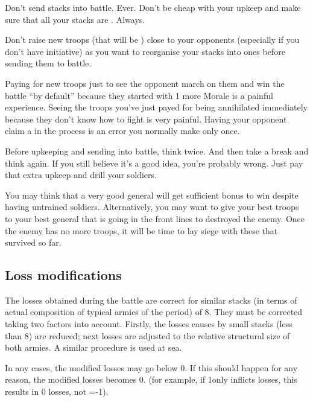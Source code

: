 \begin{playtip}
  Don't send  stacks into battle. Ever. Don't be cheap with
  your upkeep and make sure that all your stacks are . Always.

  Don't raise new troops (that will be ) close to your
  opponents (especially if you don't have initiative) as you want to
  reorganise your stacks into  ones before sending them to
  battle.

  Paying for new troops just to see the opponent march on them and win the
  battle ``by default'' because they started with 1 more Morale is a painful
  experience. Seeing the troops you've just payed for being annihilated
  immediately because they don't know how to fight is very painful. Having
  your opponent claim a  in the process is an error you
  normally make only once.

  Before upkeeping and sending  into battle, think twice. And
  then take a break and think again. If you still believe it's a good idea,
  you're probably wrong. Just pay that extra upkeep and drill your soldiers.

  You may think that a very good general will get sufficient bonus to win
  despite having untrained soldiers. Alternatively, you may want to give your
  best troops to your best general that is going in the front lines to
  destroyed the enemy. Once the enemy has no more troops, it will be time to
  lay siege with these  that survived so far.
\end{playtip}

\subsection{Loss modifications}
\label{chMilitary:Battle:Loss modifications}
The losses obtained during the battle are correct for similar stacks (in terms
of actual composition of typical armies of the period) of 8\LD. They must be
corrected taking two factors into account. Firstly, the losses causes by small
stacks (less than 8\LD) are reduced; next losses are adjusted to the relative
structural size of both armies. A similar procedure is used at sea.

In any cases, the modified losses may go below 0. If this should happen for
any reason, the modified losses becomes 0. (for example, if 1\LD only inflicts
\texttu losses, this results in 0 losses, not =-1\texttd).

